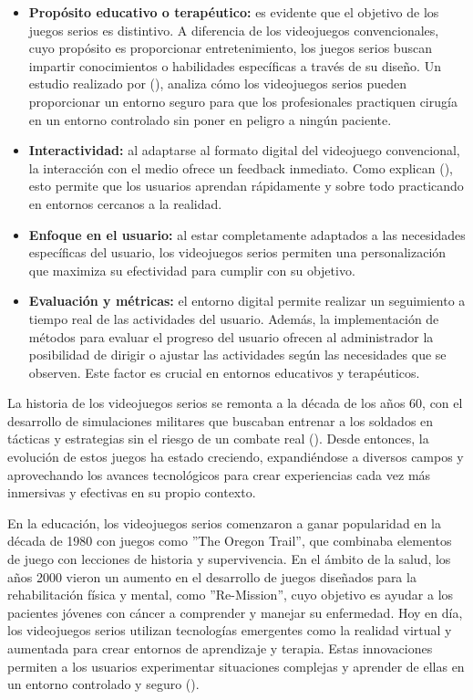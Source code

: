 \begin{itemize}
	\item \textbf{Propósito educativo o terapéutico:} es evidente que el objetivo de los juegos serios es distintivo. A diferencia de los videojuegos convencionales, cuyo propósito es proporcionar entretenimiento, los juegos serios buscan impartir conocimientos o habilidades específicas a través de su diseño. Un estudio realizado por \citeauthor{GRAAFLAND:2012} (\citeyear{GRAAFLAND:2012}), analiza cómo los videojuegos serios pueden proporcionar un entorno seguro para que los profesionales practiquen cirugía en un entorno controlado sin poner en peligro a ningún paciente.
	\item \textbf{Interactividad:} al adaptarse al formato digital del videojuego convencional, la interacción con el medio ofrece un feedback inmediato. Como explican \citeauthor{CONNOLLY:2012} (\citeyear{CONNOLLY:2012}), esto permite que los usuarios aprendan rápidamente y sobre todo practicando en entornos cercanos a la realidad.
	\item \textbf{Enfoque en el usuario:} al estar completamente adaptados a las necesidades específicas del usuario, los videojuegos serios permiten una personalización que maximiza su efectividad para cumplir con su objetivo.
	\item \textbf{Evaluación y métricas:} el entorno digital permite realizar un seguimiento a tiempo real de las actividades del usuario. Además, la implementación de métodos para evaluar el progreso del usuario ofrecen al administrador la posibilidad de dirigir o ajustar las actividades según las necesidades que se observen. Este factor es crucial en entornos educativos y terapéuticos.
\end{itemize}

La historia de los videojuegos serios se remonta a la década de los años 60, con el desarrollo de simulaciones militares que buscaban entrenar a los soldados en tácticas y estrategias sin el riesgo de un combate real (\cite{SAWYER:2002}). Desde entonces, la evolución de estos juegos ha estado creciendo, expandiéndose a diversos campos y aprovechando los avances tecnológicos para crear experiencias cada vez más inmersivas y efectivas en su propio contexto. 

En la educación, los videojuegos serios comenzaron a ganar popularidad en la década de 1980 con juegos como ''The Oregon Trail'', que combinaba elementos de juego con lecciones de historia y supervivencia. En el ámbito de la salud, los años 2000 vieron un aumento en el desarrollo de juegos diseñados para la rehabilitación física y mental, como ''Re-Mission'', cuyo objetivo es ayudar a los pacientes jóvenes con cáncer a comprender y manejar su enfermedad. Hoy en día, los videojuegos serios utilizan tecnologías emergentes como la realidad virtual y aumentada para crear entornos de aprendizaje y terapia. Estas innovaciones permiten a los usuarios experimentar situaciones complejas y aprender de ellas en un entorno controlado y seguro (\cite{FREITAS:2011}).

